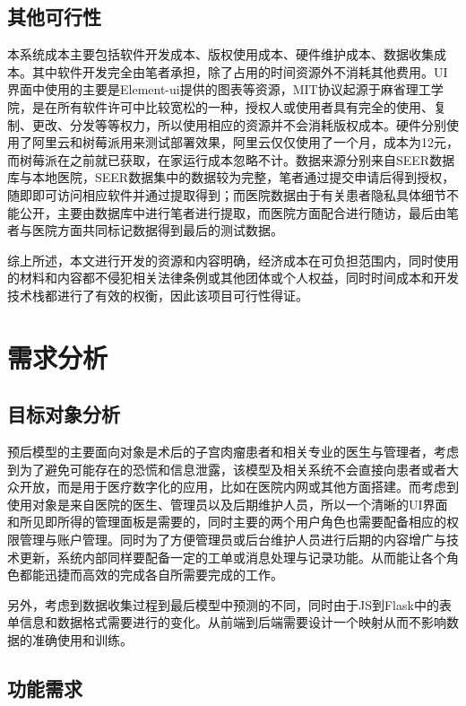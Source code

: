 \subsection{其他可行性}

本系统成本主要包括软件开发成本、版权使用成本、硬件维护成本、数据收集成本。其中软件开发完全由笔者承担，除了占用的时间资源外不消耗其他费用。UI界面中使用的主要是Element-ui提供的图表等资源，MIT协议起源于麻省理工学院，是在所有软件许可中比较宽松的一种，授权人或使用者具有完全的使用、复制、更改、分发等等权力，所以使用相应的资源并不会消耗版权成本。硬件分别使用了阿里云和树莓派用来测试部署效果，阿里云仅仅使用了一个月，成本为12元，而树莓派在之前就已获取，在家运行成本忽略不计。数据来源分别来自SEER数据库与本地医院，SEER数据集中的数据较为完整，笔者通过提交申请后得到授权，随即即可访问相应软件并通过提取得到；而医院数据由于有关患者隐私具体细节不能公开，主要由数据库中进行笔者进行提取，而医院方面配合进行随访，最后由笔者与医院方面共同标记数据得到最后的测试数据。

综上所述，本文进行开发的资源和内容明确，经济成本在可负担范围内，同时使用的材料和内容都不侵犯相关法律条例或其他团体或个人权益，同时时间成本和开发技术栈都进行了有效的权衡，因此该项目可行性得证。

\section{需求分析}

\subsection{目标对象分析}

预后模型的主要面向对象是术后的子宫肉瘤患者和相关专业的医生与管理者，考虑到为了避免可能存在的恐慌和信息泄露，该模型及相关系统不会直接向患者或者大众开放，而是用于医疗数字化的应用，比如在医院内网或其他方面搭建。而考虑到使用对象是来自医院的医生、管理员以及后期维护人员，所以一个清晰的UI界面和所见即所得的管理面板是需要的，同时主要的两个用户角色也需要配备相应的权限管理与账户管理。同时为了方便管理员或后台维护人员进行后期的内容增广与技术更新，系统内部同样要配备一定的工单或消息处理与记录功能。从而能让各个角色都能迅捷而高效的完成各自所需要完成的工作。

另外，考虑到数据收集过程到最后模型中预测的不同，同时由于JS到Flask中的表单信息和数据格式需要进行的变化。从前端到后端需要设计一个映射从而不影响数据的准确使用和训练。

\subsection{功能需求}

